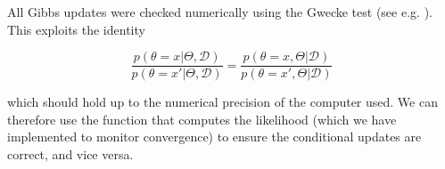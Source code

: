 All Gibbs updates were checked numerically using the Gwecke test (see e.g. \cite{grosse2014testing}). This exploits the identity

\begin{equation}
  \frac{p(\theta = x | \Theta, \mathcal{D})}{p(\theta = x' | \Theta, \mathcal{D})} =
  \frac{p(\theta = x, \Theta | \mathcal{D})}{p(\theta = x', \Theta | \mathcal{D})}
\end{equation}

which should hold up to the numerical precision of the computer used. We can therefore use the function that computes the likelihood (which we have implemented to monitor convergence) to ensure the conditional updates are correct, and vice versa.
